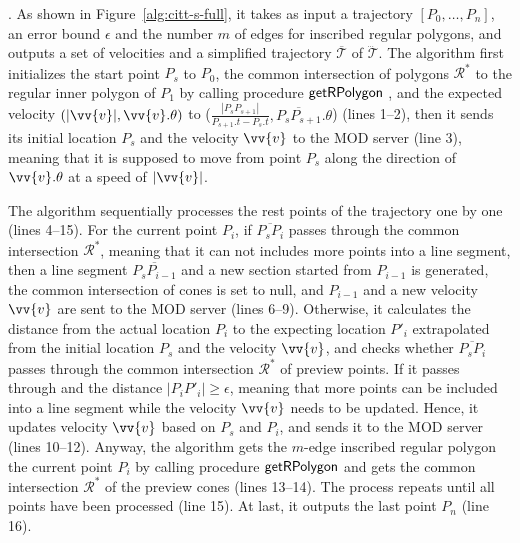 

.
As shown in Figure~\ref{alg:citt-s-full}, it takes as input a trajectory ${[P_0, \ldots, P_n]}$, an error bound $\epsilon$ and the number $m$ of edges for inscribed regular polygons, and outputs a set of velocities and a simplified  trajectory $\overline{\mathcal{T}}$ of $\dddot{\mathcal{T}}$.
%
The algorithm first initializes the start point $P_s$ to $P_0$, the common intersection of polygons $\mathcal{R}^*$ to the regular inner polygon of $P_1$ by calling procedure ${\mathsf{getRPolygon}}$ \cite{Lin:Cised}, and the expected velocity $(|\vv{v}|, \vv{v}.\theta)$ to ($\frac{|P_{s}P_{s+1}|}{P_{s+1}.t-P_s.t},\overline{P_{s}P_{s+1}}.\theta$) (lines 1--2), then it sends its initial location $P_s$ and the velocity $\vv{v}$ to the MOD server (line 3), meaning that it is supposed to move from point $P_s$ along the direction of $\vv{v}.\theta$ at a speed of $|\vv{v}|$.

The algorithm sequentially processes the rest points of the trajectory one by one (lines 4--15). 
For the current point $P_{i}$, if $\overline{P_sP_{i}}$ passes through the common intersection $\mathcal{R}^*$, meaning that it can not includes more points into a line segment, then a line segment $\overline{P_sP_{i-1}}$ and a new section started from  $P_{i-1}$ is generated, the common intersection of cones is set to null, and $P_{i-1}$ and a new velocity $\vv{v}$ are sent to the MOD server (lines 6--9).
%
Otherwise, it calculates the distance from the actual location $P_{i}$ to the expecting location $P'_{i}$ extrapolated from the initial location $P_s$ and the velocity $\vv{v}$, and checks whether $\overline{P_sP_{i}}$ passes through the common intersection $\mathcal{R}^*$ of preview points.
If it passes through and the distance $|P_{i}P'_{i}| \ge \epsilon$, meaning that more points can be included into a line segment while the velocity $\vv{v}$ needs to be updated. Hence, it updates velocity $\vv{v}$ based on $P_s$ and $P_{i}$, and sends it to the MOD server (lines 10--12). 
%
Anyway, the algorithm gets the $m$-edge inscribed regular polygon \wrt the current point $P_{i}$ by calling procedure ${\mathsf{getRPolygon}}$ \cite{Lin:Cised} and gets the common intersection $\mathcal{R}^*$ of the preview cones (lines 13--14). The process repeats until all points have been processed (line 15).
At last, it outputs the last point $P_{n}$ (line 16).




